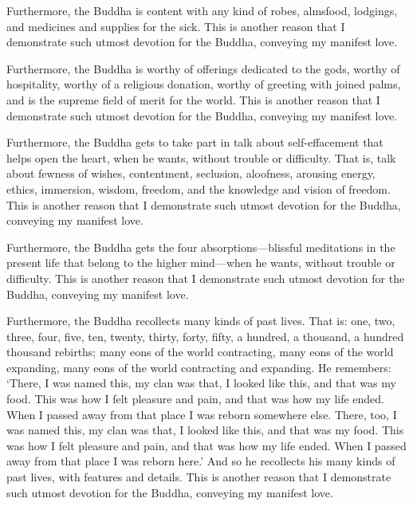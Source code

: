 \documentclass[12pt,openany]{book}%
\begin{document}
Furthermore, the Buddha is content with any kind of robes, almsfood, lodgings, and medicines and supplies for the sick. This is another reason that I demonstrate such utmost devotion for the Buddha, conveying my manifest love. 

Furthermore, the Buddha is worthy of offerings dedicated to the gods, worthy of hospitality, worthy of a religious donation, worthy of greeting with joined palms, and is the supreme field of merit for the world. This is another reason that I demonstrate such utmost devotion for the Buddha, conveying my manifest love. 

Furthermore, the Buddha gets to take part in talk about self-effacement that helps open the heart, when he wants, without trouble or difficulty. That is, talk about fewness of wishes, contentment, seclusion, aloofness, arousing energy, ethics, immersion, wisdom, freedom, and the knowledge and vision of freedom. This is another reason that I demonstrate such utmost devotion for the Buddha, conveying my manifest love. 

Furthermore, the Buddha gets the four absorptions—blissful meditations in the present life that belong to the higher mind—when he wants, without trouble or difficulty. This is another reason that I demonstrate such utmost devotion for the Buddha, conveying my manifest love. 

Furthermore, the Buddha recollects many kinds of past lives. That is: one, two, three, four, five, ten, twenty, thirty, forty, fifty, a hundred, a thousand, a hundred thousand rebirths; many eons of the world contracting, many eons of the world expanding, many eons of the world contracting and expanding. He remembers: ‘There, I was named this, my clan was that, I looked like this, and that was my food. This was how I felt pleasure and pain, and that was how my life ended. When I passed away from that place I was reborn somewhere else. There, too, I was named this, my clan was that, I looked like this, and that was my food. This was how I felt pleasure and pain, and that was how my life ended. When I passed away from that place I was reborn here.’ And so he recollects his many kinds of past lives, with features and details. This is another reason that I demonstrate such utmost devotion for the Buddha, conveying my manifest love. 
\end{document}
